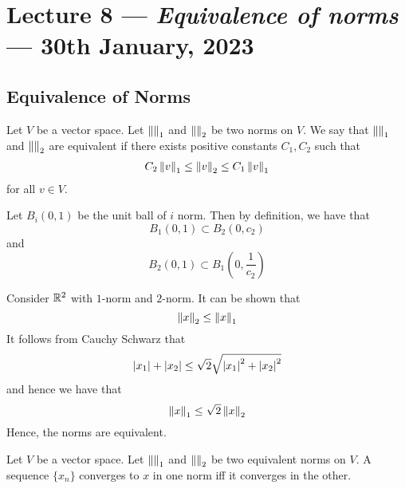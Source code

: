 \section{Lecture 8 --- \textit{Equivalence of norms} --- 30th January, 2023}

\horz

\subsection{Equivalence of Norms}
\begin{definition}
    Let $V$ be a vector space. Let $\left\lVert  \right\rVert_{1}$ and $\left\lVert  \right\rVert_{2}$ be two norms on $V$. We say that $\left\lVert  \right\rVert_{1}$ and $\left\lVert  \right\rVert_{2}$ are equivalent if there exists positive constants $C_{1}, C_{2}$ such that
    \begin{align*}
	C_{2} \left\lVert v \right\rVert_{1} \le \left\lVert v \right\rVert_{2} \le C_{1} \left\lVert v \right\rVert_{1}
    \end{align*}
    for all $v\in V$.
    \label{def:equivalent-norms}
\end{definition}

Let $B_{i} \left( 0,1 \right)$ be the unit ball of $i$ norm. Then by definition, we have that
\begin{equation*}
    B_{1} \left( 0,1 \right) \subset B_2 \left( 0, c_{2} \right)
\end{equation*} 
and
\begin{equation*}
    B_{2} \left( 0,1 \right) \subset B_{1} \left( 0,\frac{1}{c_{2}} \right)
\end{equation*}

\begin{example}
    Consider $\mathbb R ^{2}$ with $1$-norm and $2$-norm. It can be shown that
    \begin{equation*}
	\left\lVert x \right\rVert_{2} \le \left\lVert x \right\rVert_{1}
    \end{equation*}
    It follows from Cauchy Schwarz that
    \begin{equation*}
	\left\lvert x_{1} \right\rvert + \left\lvert x_{2} \right\rvert \le \sqrt{2} \sqrt{\left\lvert x_{1} \right\rvert^{2} + \left\lvert x_{2} \right\rvert^{2}}
    \end{equation*}
    and hence we have that
    \begin{equation*}
	\left\lVert x \right\rVert_{1} \le \sqrt{2} \left\lVert x \right\rVert_{2}
    \end{equation*}
    Hence, the norms are equivalent.
\end{example}

\begin{proposition}
    Let $V$ be a vector space. Let $\left\lVert  \right\rVert_{1}$ and $\left\lVert  \right\rVert_{2}$ be two equivalent norms on $V$. A sequence $\{ x_{n} \}$ converges to $x$ in one norm iff it converges in the other.
    \label{prop:equivalent-sequences-converge}
\end{proposition}

